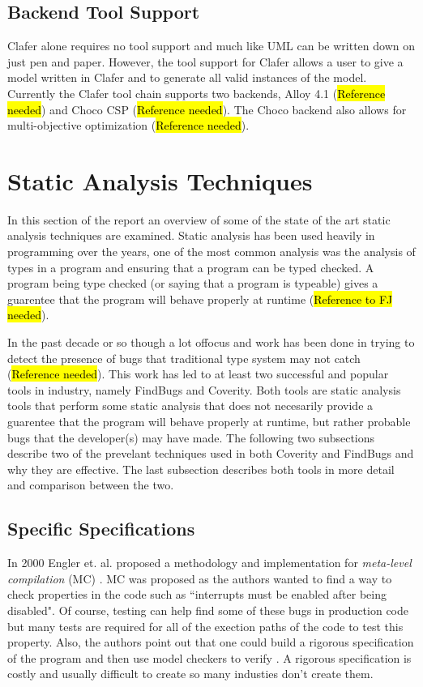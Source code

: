 \documentclass[10pt,oneside]{IEEEtran}
\begin{document}
\subsection{Backend Tool Support}
Clafer alone requires no tool support and much like UML can be written down on just pen and paper.
However, the tool support for Clafer allows a user to give a model written in Clafer and to generate
all valid instances of the model. Currently the Clafer tool chain supports two backends, Alloy 4.1
(\hl{Reference needed}) and Choco CSP (\hl{Reference needed}). The Choco backend also allows for
multi-objective optimization (\hl{Reference needed}).

\section{Static Analysis Techniques}
In this section of the report an overview of some of the state of the art static analysis techniques
are examined. Static analysis has been used heavily in programming over the years, one of the most
common analysis was the analysis of types in a program and ensuring that a program can be typed checked.
A program being type checked (or saying that a program is typeable) gives a guarentee that the program
will behave properly at runtime (\hl{Reference to FJ needed}).

In the past decade or so though a lot offocus and work has been done in trying to detect the presence of bugs that traditional type system may not catch (\hl{Reference needed}). This work has led to at least two successful and popular tools in industry, namely FindBugs and Coverity. Both tools are static analysis tools that perform some static analysis that does not necesarily provide a guarentee that the program will behave properly at runtime, but rather probable bugs that the developer(s) may have made. The following two subsections describe two of the prevelant techniques used in both Coverity and FindBugs and why they are effective. The last subsection describes both tools in more detail and comparison between the two.

\subsection{Specific Specifications}
In 2000 Engler et. al. proposed a methodology and implementation for \textit{meta-level compilation} (MC) \cite{5}. MC was proposed as the authors wanted to find a way to check properties in the code such as ``interrupts must be enabled after being disabled". Of course, testing can help find some of these bugs in production code but many tests are required for all of the exection paths of the code to test this property. Also, the authors point out that one could build a rigorous specification of the program and then use model checkers to verify \cite{5}. A rigorous specification is costly and usually difficult to create so many industies don't create them.
\end{document}
